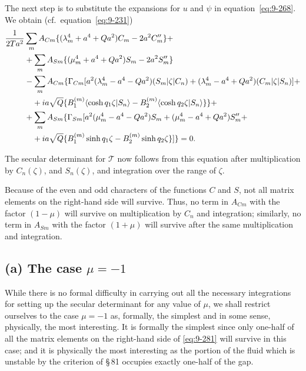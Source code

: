 The next step is to substitute the expansions for $u$ and $\psi$ in equation~\eqref{eq:9-268}. We obtain (cf.\ equation~\eqref{eq:9-231})
\begin{align}
\frac{1}{2\mathscr{T} a^2} &\sum_m A_{Cm}\{(\lambda_m^4 + a^4 + Qa^2)C_m - 2a^2 C_m''\} + \notag \\
&+ \sum_m A_{Sm}\{(\mu_m^4 + a^4 + Qa^2)S_m - 2a^2 S_m''\} \notag \\
&- \sum_m A_{Cm}\{\Gamma_{Cm}[a^2(\lambda_m^4 - a^4 - Qa^2)(S_m|\zeta|C_n) + (\lambda_m^4 - a^4 + Qa^2)(C_m|\zeta|S_n)] + \notag \\
&\quad + ia\sqrt{Q}\{B_1^{(m)}\langle\cosh q_1\zeta|S_n\rangle - B_2^{(m)}\langle\cosh q_2\zeta|S_n\rangle\}\} + \notag \\
&+ \sum_m A_{Sm}\{\Gamma_{Sm}[a^2(\mu_m^4 - a^4 - Qa^2)S_m + (\mu_m^4 - a^4 + Qa^2)S_m'' + \notag \\
&\quad + ia\sqrt{Q}\{B_1^{(m)}\sinh q_1\zeta - B_2^{(m)}\sinh q_2\zeta\}]\} = 0. \label{eq:9-281}
\end{align}

The secular determinant for $\mathscr{T}$ now follows from this equation after multiplication by $C_n(\zeta)$, and $S_n(\zeta)$, and integration over the range of $\zeta$.

Because of the even and odd characters of the functions $C$ and $S$, not all matrix elements on the right-hand side will survive. Thus, no term in $A_{Cm}$ with the factor $(1-\mu)$ will survive on multiplication by $C_n$ and integration; similarly, no term in $A_{Sm}$ with the factor $(1+\mu)$ will survive after the same multiplication and integration.

\subsection*{(a) The case $\mu = -1$}

While there is no formal difficulty in carrying out all the necessary integrations for setting up the secular determinant for any value of $\mu$, we shall restrict ourselves to the case $\mu = -1$ as, formally, the simplest and in some sense, physically, the most interesting. It is formally the simplest since only one-half of all the matrix elements on the right-hand side of \eqref{eq:9-281} will survive in this case; and it is physically the most interesting as the portion of the fluid which is unstable by the criterion of \S\,81 occupies exactly one-half of the gap.

